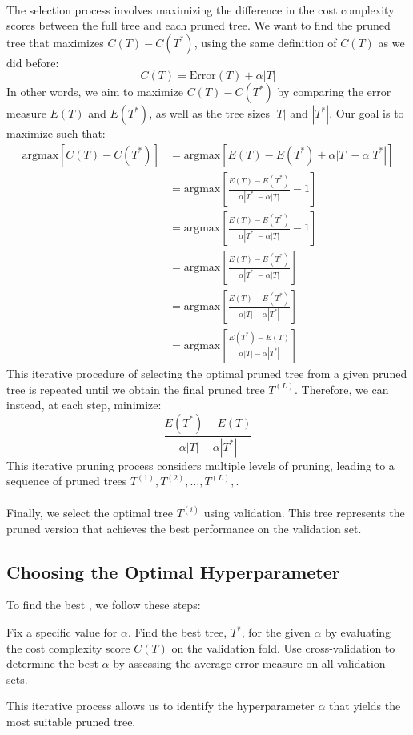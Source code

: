 \documentclass[10pt,a4paper]{report}
\begin{document}
\paragraph{}The selection process involves maximizing the difference in the cost complexity scores between the full tree and each pruned tree. We want to find the pruned tree that maximizes $C(T)-C(T^*)$, using the same definition of $C(T)$ as we did before:
$$C(T)=\textrm{Error}(T)+\alpha|T|$$
In other words, we aim to maximize $C(T)-C(T^*)$ by comparing the error measure $E(T)$ and $E(T^*)$, as well as the tree sizes $|T|$ and $|T^*|$. Our goal is to maximize  such that:
\begin{align*}
\textrm{argmax}\left[C(T)-C(T^*)\right] 
& = \textrm{argmax}\left[E(T)-E(T^*)+\alpha|T|-\alpha|T^*|\right]\\
& = \textrm{argmax}\left[\frac{E(T)-E(T^*)}{\alpha|T^*|-\alpha|T|}-1\right]\\
& = \textrm{argmax}\left[\frac{E(T)-E(T^*)}{\alpha|T^*|-\alpha|T|}-1\right]\\
& = \textrm{argmax}\left[\frac{E(T)-E(T^*)}{\alpha|T^*|-\alpha|T|}\right]\\
& = \textrm{argmax}\left[\frac{E(T)-E(T^*)}{\alpha|T|-\alpha|T^*|}\right]\\
& = \textrm{argmax}\left[\frac{E(T^*)-E(T)}{\alpha|T|-\alpha|T^*|}\right]
\end{align*}
This iterative procedure of selecting the optimal pruned tree from a given pruned tree is repeated until we obtain the final pruned tree $T^{(L)}$. Therefore, we can instead, at each step, minimize:
$$\frac{E(T^*)-E(T)}{\alpha|T|-\alpha|T^*|}$$
This iterative pruning process considers multiple levels of pruning, leading to a sequence of pruned trees $T^{(1)},T^{(2)},\dots,T^{(L)},$.
\paragraph{}Finally, we select the optimal tree $T^{(i)}$ using validation. This tree represents the pruned version that achieves the best performance on the validation set.
\subsection{Choosing the Optimal Hyperparameter}
To find the best , we follow these steps:
\begin{algorithm}[H]
\begin{algorithmic}[1]
   \State Fix a specific value for $\alpha$.
   \State Find the best tree, $T^*$, for the given $\alpha$ by evaluating the cost complexity score $C(T)$ on the validation fold.
	\State Use cross-validation to determine the best $\alpha$ by assessing the average error measure on all validation sets.
\end{algorithmic}
\end{algorithm}
This iterative process allows us to identify the hyperparameter $\alpha$ that yields the most suitable pruned tree.
\end{document}
